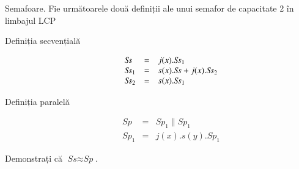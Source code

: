 \documentclass[addpoints,12pt,a4paper,answers]{exam}
\begin{document}
\begin{questions}
Semafoare.  Fie următoarele două definiții ale unui semafor de capacitate 2 în limbajul LCP

\begin{description}
\item[Definiția secvențială]
\[
\begin{array}{lcl}
\textit{\textit{Ss}} & =  & j(x). \textit{Ss}_1\\
\textit{Ss}_1 & = & s(x).\textit{Ss} + j(x).\textit{Ss}_2 \\
\textit{Ss}_2 & = & s(x).\textit{Ss}_1
\end{array}
\]
\item[Definiția paralelă]
\[
\begin{array}{lcl}
\textit{Sp} & =  & \textit{Sp}_1 \parallel \textit{Sp}_1\\
\textit{Sp}_1 & = & j(x).s(y).\textit{Sp}_1
\end{array}
\]
\end{description}

Demonstrați că $\textit{Ss}  \approx \textit{Sp}$.

\end{questions}
\end{document}
